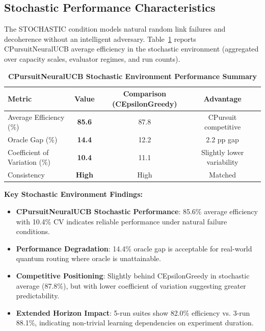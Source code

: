 \documentclass[12pt,a4paper]{article}
\newcommand{\stochastic}[1]{\textcolor{stochasticcolor}{\textbf{#1}}}
\begin{document}
\begin{tcolorbox}[colback=stochasticcolor!10,colframe=stochasticcolor,title=\textbf{Stochastic Environment Deep Analysis (CPursuitNeuralUCB, 1$\times$–2$\times$ Capacities, T/Tb Combined)}]

\subsection{Stochastic Performance Characteristics}

The STOCHASTIC condition models natural random link failures and decoherence without an intelligent adversary. Table~\ref{tab:stoch-performance} reports CPursuitNeuralUCB average efficiency in the stochastic environment (aggregated over capacity scales, evaluator regimes, and run counts).

\begin{table}[H]
\centering
\caption{\stochastic{CPursuitNeuralUCB Stochastic Environment Performance Summary}}
\label{tab:stoch-performance}
\begin{tabular}{|l|c|c|c|c|}
\hline
\textbf{Metric} & \textbf{Value} & \textbf{Comparison (CEpsilonGreedy)} & \textbf{Advantage} \\
\hline
\hline
Average Efficiency (\%) & \stochastic{\textbf{85.6}} & 87.8 & CPursuit competitive \\
Oracle Gap (\%)         & \stochastic{\textbf{14.4}} & 12.2 & 2.2 pp gap \\
Coefficient of Variation (\%) & \stochastic{\textbf{10.4}} & 11.1 & Slightly lower variability \\
Consistency             & \stochastic{High}          & High & Matched \\
\hline
\end{tabular}
\end{table}

\textbf{Key Stochastic Environment Findings:}
\begin{itemize}
\item \stochastic{CPursuitNeuralUCB Stochastic Performance}: 85.6\% average efficiency with 10.4\% CV indicates reliable performance under natural failure conditions.
\item \stochastic{Performance Degradation}: 14.4\% oracle gap is acceptable for real-world quantum routing where oracle is unattainable.
\item \stochastic{Competitive Positioning}: Slightly behind CEpsilonGreedy in stochastic average (87.8\%), but with lower coefficient of variation suggesting greater predictability.
\item \stochastic{Extended Horizon Impact}: 5-run suites show 82.0\% efficiency vs. 3-run 88.1\%, indicating non-trivial learning dependencies on experiment duration.
\end{itemize}

\end{tcolorbox}
\end{document}
